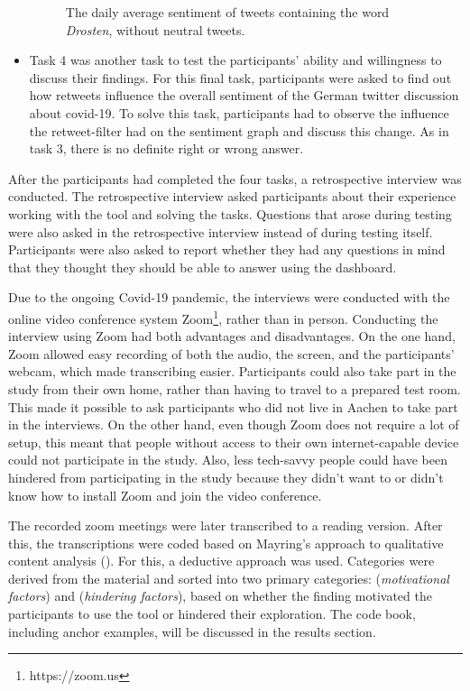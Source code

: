 \begin{itemize}
\begin{figure}[h!tb]
        \caption{The daily average sentiment of tweets containing the word \emph{Drosten}, without neutral tweets.}
        \label{fig:sentiment_drosten_noneutral}
    \end{figure}
    \item Task 4 was another task to test the participants' ability and willingness to discuss their findings. %
    For this final task, participants were asked to find out how retweets influence the overall sentiment of the German twitter discussion about covid-19. To solve this task, participants had to observe the influence the retweet-filter had on the sentiment graph and discuss this change. As in task 3, there is no definite right or wrong answer.
\end{itemize}

After the participants had completed the four tasks, a retrospective interview was conducted. The retrospective interview asked participants about their experience working with the tool and solving the tasks. Questions that arose during testing were also asked in the retrospective interview instead of during testing itself. Participants were also asked to report whether they had any questions in mind that they thought they should be able to answer using the dashboard.

Due to the ongoing Covid-19 pandemic, the interviews were conducted with the online video conference system Zoom\footnote{https://zoom.us}, rather than in person. Conducting the interview using Zoom had both advantages and disadvantages. On the one hand, Zoom allowed easy recording of both the audio, the screen, and the participants' webcam, which made transcribing easier. Participants could also take part in the study from their own home, rather than having to travel to a prepared test room. This made it possible to ask participants who did not live in Aachen to take part in the interviews.
On the other hand, even though Zoom does not require a lot of setup, this meant that people without access to their own internet-capable device could not participate in the study. Also, less tech-savvy people could have been hindered from participating in the study because they didn't want to or didn't know how to install Zoom and join the video conference.

The recorded zoom meetings were later transcribed to a reading version. After this, the transcriptions were coded based on Mayring's approach to qualitative content analysis (\cite{mayring2010qualitative}). For this, a deductive approach was used. Categories were derived from the material and sorted into two primary categories:  (\emph{motivational factors}) and  (\emph{hindering factors}), based on whether the finding motivated the participants to use the tool or hindered their exploration. The code book, including anchor examples, will be discussed in the results section. 
